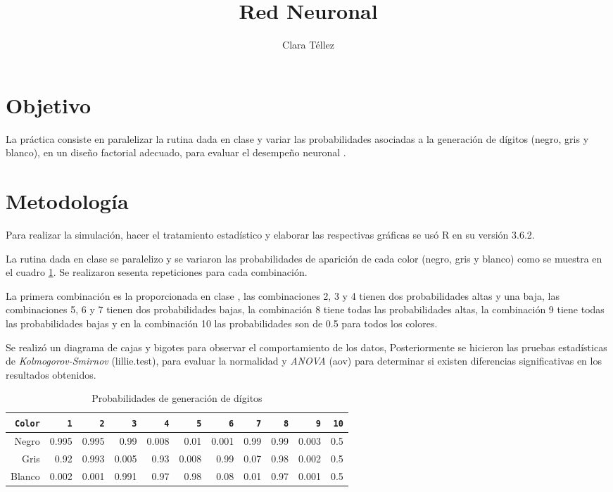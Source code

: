 \documentclass{article}
\begin{document}
\title{\textbf{Red Neuronal}}
\author{Clara T\'ellez}
\maketitle

\section{Objetivo}\label{obj}

La pr\'actica consiste en paralelizar la rutina dada en clase y variar las probabilidades asociadas a la generaci\'on de d\'igitos (negro, gris y blanco), en un dise\~no factorial adecuado, para evaluar el desempe\~no neuronal \cite{eli}.

\section{Metodolog\'ia}\label{met}

Para realizar la simulaci\'on, hacer el tratamiento estad\'istico y elaborar las respectivas gr\'aficas se us\'o R en su versi\'on 3.6.2.

La rutina dada en clase se paralelizo y se variaron las probabilidades de aparici\'on de cada color (negro, gris y blanco) como se muestra en el cuadro \ref{t1}.   Se realizaron sesenta repeticiones para cada combinaci\'on.

La primera combinaci\'on es la proporcionada en clase \cite{eli}, las combinaciones 2, 3 y 4 tienen dos probabilidades altas y una baja, las combinaciones 5, 6 y 
7 tienen dos probabilidades bajas, la combinaci\'on 8 tiene todas las probabilidades altas, la combinaci\'on 9 tiene todas las probabilidades bajas y en la combinaci\'on 10 las probabilidades son de 0.5 para todos los colores.

Se realiz\'o un diagrama de cajas y bigotes para observar el comportamiento de los datos,  Posteriormente se hicieron las pruebas estad\'isticas de {\em Kolmogorov-Smirnov} (lillie.test), para evaluar la normalidad y {\em ANOVA} (aov) para determinar si existen diferencias significativas en los resultados obtenidos.

\begin{table} 
 \caption{Probabilidades de generaci\'on de d\'igitos}
 \label{t1}
 \begin{center}
 \begin{tabular}{|r|r|r|r|r|r|r|r|r|r|r|}
\hline
\texttt{Color} & \texttt{1} & \texttt{2} &\texttt{3} & \texttt{4}  & \texttt{5} &\texttt{6} & \texttt{7}  & \texttt{8} & \texttt{9}  & \texttt{10}\\
\hline
Negro& 0.995 & 0.995 & 0.99 & 0.008 & 0.01 & 0.001 & 0.99 & 0.99 & 0.003 & 0.5 \\     
\hline
Gris & 0.92 & 0.993 & 0.005 & 0.93 & 0.008 & 0.99 & 0.07 & 0.98 & 0.002 & 0.5 \\ 
\hline
Blanco  & 0.002 & 0.001 & 0.991 & 0.97 & 0.98 & 0.08 & 0.01 & 0.97 & 0.001 & 0.5 \\ 
\hline
\end{tabular}
\end{center}
\end{table}
\end{document}
